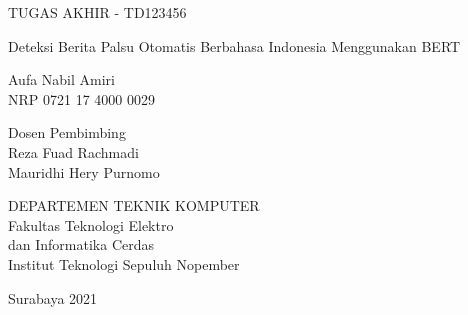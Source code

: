 TUGAS AKHIR - TD123456

\vspace{6ex}

\begin{large}
  Deteksi Berita Palsu Otomatis Berbahasa Indonesia Menggunakan BERT
\end{large}

\vspace{4ex}

Aufa Nabil Amiri \\
NRP 0721 17 4000 0029

\vspace{2ex}

Dosen Pembimbing \\
Reza Fuad Rachmadi \\
Mauridhi Hery Purnomo

\vspace{6ex}

DEPARTEMEN TEKNIK KOMPUTER \\
Fakultas Teknologi Elektro \\
dan Informatika Cerdas \\
Institut Teknologi Sepuluh Nopember

Surabaya 2021
